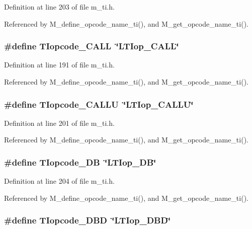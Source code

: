 Definition at line 203 of file m\_\-ti.h.

Referenced by M\_\-define\_\-opcode\_\-name\_\-ti(), and M\_\-get\_\-opcode\_\-name\_\-ti().
\subsubsection{\setlength{\rightskip}{0pt plus 5cm}\#define TIopcode\_\-CALL~\char`\"{}LTIop\_\-CALL\char`\"{}}\label{m__ti_8h_893edc7b754281b9ca9499659c3e5700}




Definition at line 191 of file m\_\-ti.h.

Referenced by M\_\-define\_\-opcode\_\-name\_\-ti(), and M\_\-get\_\-opcode\_\-name\_\-ti().
\subsubsection{\setlength{\rightskip}{0pt plus 5cm}\#define TIopcode\_\-CALLU~\char`\"{}LTIop\_\-CALLU\char`\"{}}\label{m__ti_8h_3b52d494b1dcb66334a494aa7716313b}




Definition at line 201 of file m\_\-ti.h.

Referenced by M\_\-define\_\-opcode\_\-name\_\-ti(), and M\_\-get\_\-opcode\_\-name\_\-ti().
\subsubsection{\setlength{\rightskip}{0pt plus 5cm}\#define TIopcode\_\-DB~\char`\"{}LTIop\_\-DB\char`\"{}}\label{m__ti_8h_0fdc83cc9a77bc69d76d6bf287ba1140}




Definition at line 204 of file m\_\-ti.h.

Referenced by M\_\-define\_\-opcode\_\-name\_\-ti(), and M\_\-get\_\-opcode\_\-name\_\-ti().
\subsubsection{\setlength{\rightskip}{0pt plus 5cm}\#define TIopcode\_\-DBD~\char`\"{}LTIop\_\-DBD\char`\"{}}\label{m__ti_8h_bd3de3237faf2901fbfaa918039833c4}




